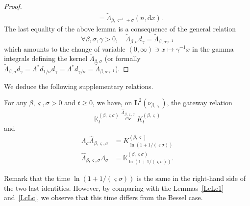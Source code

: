 \documentclass[AHL,Unicode,longabstracts]{cedram}
\newcommand{\iy}{\infty}
\newcommand{\wi}{\widetilde}
\newcommand{\wit}{\widehat}
\newcommand{\dLs}{{\discret{K}}}
\newcommand{\Ls}{K}
\newcommand{\esL}{\mathbf{L}}
\newcommand{\discret}[1]{\mathds{#1}}
\newcommand{\Gate}[3]{#1\stackrel{#2}{\curvearrowright}#3}
\let\oldforall\forall
\renewcommand*{\forall}{\mathrel{\oldforall}}
\newcommand*{\dd}{\mathrm{d}}
\newcommand*{\dx}{\dd x}
\begin{document}
\begin{proof}
\begin{align*}
&=\wi \Lambda_{\beta,\varsigma^{-1}+\sigma}(n,\dx).
\end{align*}
The last equality of the above lemma is a consequence of the general relation
\[
\forall \beta,\sigma,\gamma>0,\quad \wi \Lambda_{\beta,\sigma}d_\gamma=\wi \Lambda_{\beta,\sigma\gamma^{-1}}
\]
which amounts to the change of variable $(0,\iy)\ni x\mapsto \gamma^{-1}x$ in the gamma integrals defining the kernel $ \wi \Lambda_{\beta,\sigma}$ (or formally $\wi \Lambda_{\beta,\sigma}d_\gamma=\Lambda^*d_{1/\sigma}d_\gamma=\Lambda^*d_{\gamma/\sigma}=\wi \Lambda_{\beta,\sigma\gamma^{-1}}$).
\end{proof}

We deduce the following supplementary relations.

\begin{prop}\label{prop:dual-gat}
For any $\beta,\varsigma,\sigma>0$ and $t\geq 0$, we have, on $\esL^2(\nu_{\beta,\varsigma})$, the gateway relation
\[
\Gate{\dLs_{t}^{(\beta,\varsigma\sigma)}}{ \wit \Lambda_{\beta,\varsigma,\sigma} }{\Ls_{t}^{(\beta,\varsigma)}}
\]
and
\begin{align*}
\Lambda_\sigma\wit \Lambda_{\beta,\varsigma,\sigma}&=\Ls_{\ln(1+1/(\varsigma\sigma))}^{(\beta,\varsigma)}\\
\wit \Lambda_{\beta,\varsigma,\sigma}\Lambda_\sigma&=\dLs_{\ln(1+1/(\varsigma\sigma))}^{(\beta,\varsigma\sigma)}.
\end{align*}
\end{prop}

Remark that the time $\ln(1+1/(\varsigma\sigma))$ is the same in the right-hand side of the two last identities. However, by comparing with the Lemmas~\ref{LcLc1} and~\ref{LcLc}, we observe that this time differs from the Bessel case.
\end{document}
